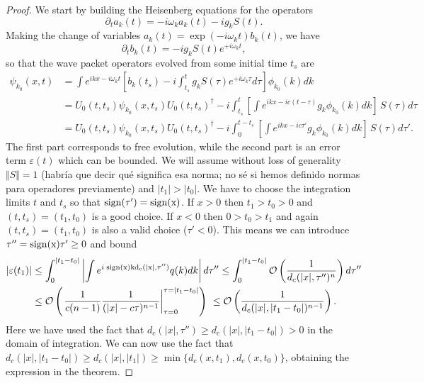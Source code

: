 \documentclass[notitlepage, prx, preprint, amsmath,superscriptaddress,amssymb]{revtex4-1}
\begin{document}
\begin{proof}
We start by building the Heisenberg equations for the operators
\begin{equation}
\partial_t a_k(t) = -i\omega_k a_k(t) - i g_k S(t).
\end{equation}
Making the change of variables $a_k(t) = \exp(-i\omega_k t)b_k(t)$, we have
\begin{equation}
\partial_t b_k(t) = -ig_k S(t) e^{+i\omega_k t},
\end{equation}
so that the wave packet operators evolved from some initial time $t_{s}$ are
\begin{align}
\psi_{k_0}(x,t) &= \int e^{ik  x - i \omega_k t} \left[b_k(t_s)
-i\int_{t_{s}}^t g_k S(\tau)e^{+i\omega_k \tau}d\tau\right]\phi_{k_0}(k)dk\\
&=U_0(t,t_s)\psi_{k_0}(x,t_s)U_0(t,t_s)^\dagger - 
i\int_{t_{s}}^t \left[\int e^{ik x-ic(t-\tau)}g_k\phi_{k_0}(k)dk
\right]\,S(\tau)d\tau\\
&=U_0(t,t_s)\psi_{k_0}(x,t_s)U_0(t,t_s)^\dagger- 
i\int_{0}^{t-t_s} \left[\int e^{ik x-ic\tau'}g_k\phi_{k_0}(k)dk
\right]\,S(\tau)d\tau'.
\end{align}
The first part corresponds to free evolution, while the second part is an error term $\varepsilon(t)$ which can be bounded. We will assume without loss of generality $\Vert{S}\Vert=1$ {\color{red}(habría que decir qué significa esa norma; no sé si hemos definido normas para operadores previamente)} and $|t_1|>|t_0|$. We have to choose the integration limits $t$ and $t_s$ so that $\rm{sign}(\tau')=\rm{sign}(x)$. If $x>0$ then $t_1>t_0>0$ and $(t,t_s)=(t_1,t_0)$ is a good choice. If $x<0$ then $0>t_0>t_1$ and again $(t,t_s)=(t_1,t_0)$ is also a valid choice ($\tau'<0$). This means we can introduce $\tau''=\rm{sign}(x)\tau'\geq 0$ and bound
\begin{align}
|\varepsilon(t_1)|
&\leq \int_{0}^{|t_1-t_0|} \left|\int e^{i\;\rm{sign}(x)kd_c(|x|,\tau'')}q(k)dk\right|d\tau''
\leq \int_{0}^{|t_1-t_0|} \mathcal{O}\left(\frac{1}{d_c(| x|,\tau'')^{n}}\right)d\tau''\\
&\leq \mathcal{O}\left(
\left. \frac{1}{c(n-1)} \frac{1}{(| x|-c\tau)^{n-1}}\right|_{\tau=0}^{\tau=|t_1-t_0|}\right)\
\leq \mathcal{O}\left(\frac{1}{d_c(| x|,|t_1-t_0|)^{n-1}}\right).
\end{align}
Here we have used the fact that $d_c(| x|,\tau'')\geq d_c(| x|,|t_1-t_0|)> 0$ in the domain of integration. We can now use the fact that $d_c(| x|,|t_1-t_0|)\geq d_c(|x|,|t_1|)\geq \min\{d_c(x,t_1),d_c(x,t_0)\}$, obtaining the expression in the theorem.
\end{proof}
\end{document}
